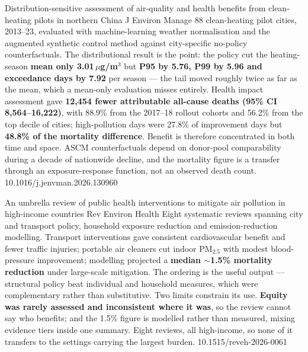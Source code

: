\documentclass[10pt]{article}
\begin{document}
{Distribution-sensitive assessment of air-quality and health benefits from clean-heating pilots in northern China}
{J Environ Manage}
{88 clean-heating pilot cities, 2013--23, evaluated with machine-learning weather
normalisation and the augmented synthetic control method against city-specific no-policy
counterfactuals. The distributional result is the point: the policy cut the heating-season
\textbf{mean only 3.01\,$\mu$g/m$^3$} but \textbf{P95 by 5.76, P99 by 5.96 and exceedance
days by 7.92} per season --- the tail moved roughly twice as far as the mean, which a
mean-only evaluation misses entirely. Health impact assessment gave \textbf{12{,}454 fewer
attributable all-cause deaths (95\% CI 8{,}564--16{,}222)}, with 88.9\% from the 2017--18
rollout cohorts and 56.2\% from the top decile of cities; high-pollution days were 27.8\%
of improvement days but \textbf{48.8\% of the mortality difference}. Benefit is therefore
concentrated in both time and space. ASCM counterfactuals depend on donor-pool
comparability during a decade of nationwide decline, and the mortality figure is a
transfer through an exposure-response function, not an observed death count.}
{10.1016/j.jenvman.2026.130960}

{An umbrella review of public health interventions to mitigate air pollution in high-income countries}
{Rev Environ Health}
{Eight systematic reviews spanning city and transport policy, household exposure reduction
and emission-reduction modelling. Transport interventions gave consistent cardiovascular
benefit and fewer traffic injuries; portable air cleaners cut indoor PM$_{2.5}$ with modest
blood-pressure improvement; modelling projected a \textbf{median $\sim$1.5\% mortality
reduction} under large-scale mitigation. The ordering is the useful output --- structural
policy beat individual and household measures, which were complementary rather than
substitutive. Two limits constrain its use. \textbf{Equity was rarely assessed and
inconsistent where it was}, so the review cannot say who benefits; and the 1.5\% figure is
modelled rather than measured, mixing evidence tiers inside one summary. Eight reviews, all
high-income, so none of it transfers to the settings carrying the largest burden.}
{10.1515/reveh-2026-0061}

\end{document}
